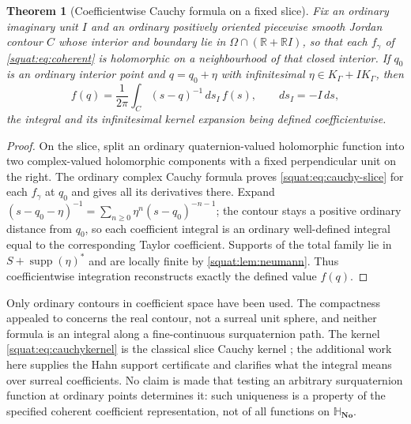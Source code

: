 \documentclass[11pt,letterpaper]{article}
\numberwithin{equation}{section}
\newtheorem{theorem}{Theorem}[section]
\theoremstyle{definition}
\theoremstyle{remark}
\newcommand{\No}{\mathbf{No}}
\newcommand{\SQ}{\mathbb H_{\No}}
\newcommand{\R}{\mathbb R}
\newcommand{\supp}{\operatorname{supp}}
\begin{document}
\begin{theorem}[Coefficientwise Cauchy formula on a fixed slice]\label{squat:thm:cauchy-slice}
Fix an ordinary imaginary unit $I$ and an ordinary positively oriented piecewise smooth
Jordan contour $C$ whose interior and boundary lie in $\Omega\cap(\R+\R I)$, so that each
$f_\gamma$ of \cref{squat:eq:coherent} is holomorphic on a neighbourhood of that closed
interior. If $q_0$ is an ordinary interior point and $q=q_0+\eta$ with infinitesimal
$\eta\in K_\Gamma+IK_\Gamma$, then
\begin{equation}\label{squat:eq:cauchy-slice}
 f(q)=\frac1{2\pi}\int_C(s-q)^{-1}\,ds_I\,f(s),\qquad ds_I=-I\,ds,
\end{equation}
the integral and its infinitesimal kernel expansion being defined coefficientwise.
\end{theorem}
\begin{proof}
On the slice, split an ordinary quaternion-valued holomorphic function into two
complex-valued holomorphic components with a fixed perpendicular unit on the right. The
ordinary complex Cauchy formula proves \cref{squat:eq:cauchy-slice} for each $f_\gamma$ at
$q_0$ and gives all its derivatives there. Expand
$(s-q_0-\eta)^{-1}=\sum_{n\ge0}\eta^n(s-q_0)^{-n-1}$; the contour stays a positive ordinary
distance from $q_0$, so each coefficient integral is an ordinary well-defined integral
equal to the corresponding Taylor coefficient. Supports of the total family lie in
$S+\supp(\eta)^*$ and are locally finite by \cref{squat:lem:neumann}. Thus coefficientwise
integration reconstructs exactly the defined value $f(q)$.
\end{proof}

Only ordinary contours in coefficient space have been used. The compactness appealed to
concerns the real contour, not a surreal unit sphere, and neither formula is an integral
along a fine-continuous surquaternion path. The kernel
\cref{squat:eq:cauchykernel} is the classical slice Cauchy kernel \cite{GP}; the additional
work here supplies the Hahn support certificate and clarifies what the integral means over
surreal coefficients. No claim is made that testing an arbitrary surquaternion function at
ordinary points determines it: such uniqueness is a property of the specified coherent
coefficient representation, not of all functions on $\SQ$.
\end{document}

